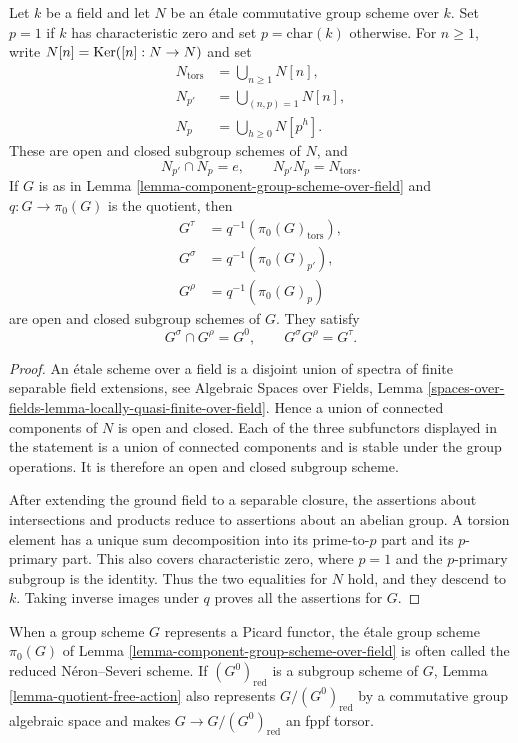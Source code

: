 \begin{lemma}
\label{lemma-torsion-component-subgroups}
Let $k$ be a field and let $N$ be an \'etale commutative group scheme over
$k$. Set $p = 1$ if $k$ has characteristic zero and set
$p = \text{char}(k)$ otherwise. For $n \geq 1$, write
$N[n] = \mathop{\mathrm{Ker}}([n] : N \to N)$ and set
\begin{align*}
N_{\mathrm{tors}} & = \bigcup_{n \geq 1} N[n], \\
N_{p'} & = \bigcup_{(n,p)=1} N[n], \\
N_p & = \bigcup_{h \geq 0} N[p^h].
\end{align*}
These are open and closed subgroup schemes of $N$, and
$$
N_{p'} \cap N_p = e, \qquad N_{p'}N_p = N_{\mathrm{tors}}.
$$
If $G$ is as in Lemma \ref{lemma-component-group-scheme-over-field} and
$q : G \to \pi_0(G)$ is the quotient, then
\begin{align*}
G^\tau & = q^{-1}(\pi_0(G)_{\mathrm{tors}}), \\
G^\sigma & = q^{-1}(\pi_0(G)_{p'}), \\
G^\rho & = q^{-1}(\pi_0(G)_p)
\end{align*}
are open and closed subgroup schemes of $G$. They satisfy
$$
G^\sigma \cap G^\rho = G^0, \qquad
G^\sigma G^\rho = G^\tau.
$$
\end{lemma}

\begin{proof}
An \'etale scheme over a field is a disjoint union of spectra of finite
separable field extensions, see Algebraic Spaces over Fields, Lemma
\ref{spaces-over-fields-lemma-locally-quasi-finite-over-field}. Hence a
union of connected components of $N$ is open and closed. Each of the three
subfunctors displayed in the statement is a union of connected components
and is stable under the group operations. It is therefore an open and
closed subgroup scheme.

After extending the ground field to a separable closure, the assertions
about intersections and products reduce to assertions about an abelian
group. A torsion element has a unique sum decomposition into its
prime-to-$p$ part and its $p$-primary part. This also covers characteristic
zero, where $p=1$ and the $p$-primary subgroup is the identity. Thus the
two equalities for $N$ hold, and they descend to $k$. Taking inverse images
under $q$ proves all the assertions for $G$.
\end{proof}

\begin{remark}
\label{remark-component-group-picard-scheme}
When a group scheme $G$ represents a Picard functor, the \'etale group
scheme $\pi_0(G)$ of Lemma
\ref{lemma-component-group-scheme-over-field} is often called the
reduced N\'eron--Severi scheme. If $(G^0)_{\mathrm{red}}$ is a subgroup
scheme of $G$, Lemma \ref{lemma-quotient-free-action} also represents
$G/(G^0)_{\mathrm{red}}$ by a commutative group algebraic space and makes
$G \to G/(G^0)_{\mathrm{red}}$ an fppf torsor.
\end{remark}

